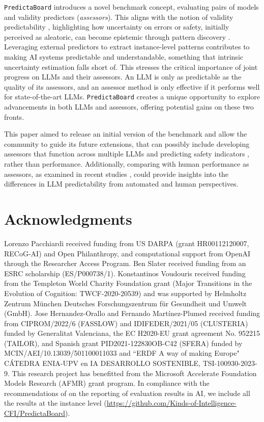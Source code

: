 \documentclass[11pt]{article}
\newcommand{\predbench}{{\tt PredictaBoard}\xspace}
\begin{document}
\predbench introduces a novel benchmark concept, evaluating pairs of models and validity predictors (\textit{assessors}). This aligns with the notion of validity predictability \citep{zhou2024predictableartificialintelligence}, highlighting how uncertainty on errors or safety, initially perceived as aleatoric, can become epistemic through pattern discovery \citep{hullermeier2021aleatoric}. %
Leveraging external predictors to extract instance-level patterns contributes to making AI systems predictable and understandable, something that intrinsic uncertainty estimation falls short of. This stresses the critical importance of joint progress on LLMs and their assessors. An LLM is only as predictable as the quality of its assessors, and an assessor method is only effective if it performs well for state-of-the-art LLMs. \predbench creates a unique opportunity to explore advancements in both LLMs and assessors, offering potential gains on these two fronts. %

This paper aimed to release an initial version of the benchmark and allow the community to guide its future extensions, that can  possibly include developing assessors that function across multiple LLMs and predicting safety indicators \citep{zhang-etal-2024-safetybench, mazeika2024harmbench}, rather than performance.
Additionally, comparing with human performance as assessors, as examined in recent studies \citep{carlini_gpt4_challenge,vafa2024large,gao2024take, zhou2024larger}, could provide insights into the differences in LLM predictability from automated and human perspectives.


\section*{Acknowledgments}
Lorenzo Pacchiardi received funding from US DARPA (grant HR00112120007, RECoG-AI) and Open Philanthropy, and computational support from OpenAI through the Researcher Access Program. Ben Slater received funding from an ESRC scholarship (ES/P000738/1). Konstantinos Voudouris received funding from the Templeton World Charity Foundation grant (Major Transitions in the Evolution of Cognition: TWCF-2020-20539) and was supported by Helmholtz Zentrum München Deutsches Forschungszentrum für Gesundheit und Umwelt (GmbH).
Jose Hernandez-Orallo and Fernando Martínez-Plumed received funding from CIPROM/2022/6 (FASSLOW) and IDIFEDER/2021/05 (CLUSTERIA) funded by Generalitat Valenciana, 
the EC H2020-EU grant agreement No. 952215 (TAILOR), 
and Spanish grant PID2021-122830OB-C42 (SFERA) funded by MCIN/AEI/10.13039/501100011033 and ``ERDF A way of making Europe" 
CÁTEDRA ENIA-UPV en IA DESARROLLO SOSTENIBLE, TSI-100930-2023-9.
This research project has benefitted from the Microsoft Accelerate Foundation Models Research (AFMR) grant program.
In compliance with the recommendations of  \citet{burnell2023rethink} on the reporting of evaluation results in AI, we include all the results at the instance level (\url{https://github.com/Kinds-of-Intelligence-CFI/PredictaBoard}).
\end{document}
